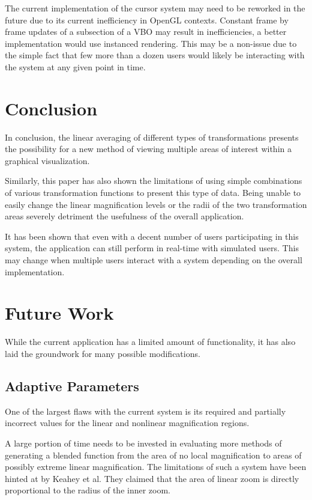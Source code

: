 \documentclass[annual]{acmsiggraph}
\begin{document}
The current implementation of the cursor system may need to be reworked
in the future due to its current inefficiency in OpenGL contexts. Constant
frame by frame updates of a subsection of a VBO may result in inefficiencies,
a better implementation would use instanced rendering. This may be a non-issue
due to the simple fact that few more than a dozen users would likely be
interacting with the system at any given point in time. 

\section{Conclusion}
In conclusion, the linear averaging of different types of transformations
presents the possibility for a new method of viewing multiple areas
of interest within a graphical visualization.

Similarly, this paper has also shown the limitations of using simple
combinations of various transformation functions to present this type of
data. Being unable to easily change the linear magnification levels or the
radii of the two transformation areas severely detriment the usefulness
of the overall application.

It has been shown that even with a decent number of users participating
in this system, the application can still perform in real-time with
simulated users. This may change when multiple users interact with a
system depending on the overall implementation.

\section{Future Work}
While the current application has a limited amount of functionality, it
has also laid the groundwork for many possible modifications.

\subsection{Adaptive Parameters}
One of the largest flaws with the current system is its required and
partially incorrect values for the linear and nonlinear magnification
regions.

A large portion of time needs to be invested in evaluating more methods
of generating a blended function from the area of no local magnification
to areas of possibly extreme linear magnification. The limitations of such
a system have been hinted at by Keahey et al. They claimed that the area
of linear zoom is directly proportional to the radius of the inner zoom.
\cite{kr96}
\end{document}
